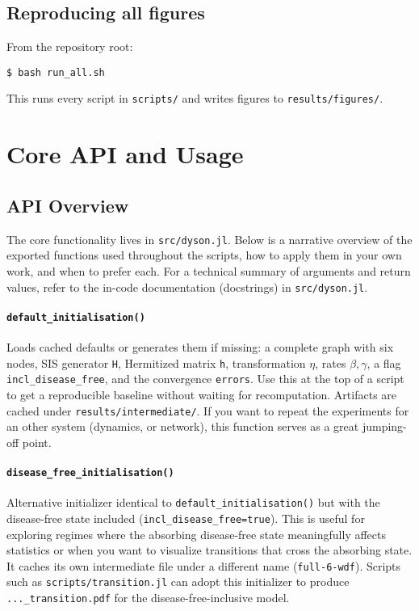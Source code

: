 \documentclass[11pt]{article}
\newcommand{\code}[1]{\texttt{#1}}
\begin{document}
\subsection{Reproducing all figures}
From the repository root:
\begin{Verbatim}[fontsize=\small]
$ bash run_all.sh
\end{Verbatim}
This runs every script in \code{scripts/} and writes figures to \code{results/figures/}.

\section{Core API and Usage}
\subsection{API Overview}
The core functionality lives in \code{src/dyson.jl}.
Below is a narrative overview of the exported functions used throughout the scripts, how to apply them in your own work, and when to prefer each.
For a technical summary of arguments and return values, refer to the in-code documentation (docstrings) in \code{src/dyson.jl}.

\paragraph{\code{default\_initialisation()}} Loads cached defaults or generates them if missing: a complete graph with six nodes, SIS generator \code{H}, Hermitized matrix \code{h}, transformation \(\eta\), rates \(\beta,\gamma\), a flag \code{incl\_disease\_free}, and the convergence \code{errors}.
Use this at the top of a script to get a reproducible baseline without waiting for recomputation. Artifacts are cached under \code{results/intermediate/}.
If you want to repeat the experiments for an other system (dynamics, or network), this function serves as a great jumping-off point.
\paragraph{\code{disease\_free\_initialisation()}} Alternative initializer identical to \code{default\_initialisation()} but with the disease-free state included (\code{incl\_disease\_free=true}).
This is useful for exploring regimes where the absorbing disease-free state meaningfully affects statistics or when you want to visualize transitions that cross the absorbing state.
It caches its own intermediate file under a different name (\code{full-6-wdf}). Scripts such as \code{scripts/transition.jl} can adopt this initializer to produce \code{...\_transition.pdf} for the disease-free-inclusive model.
\end{document}
